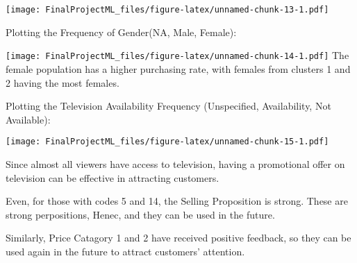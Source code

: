 \documentclass[
]{article}
\newenvironment{Shaded}{\begin{snugshade}}{\end{snugshade}}
\newcommand{\DataTypeTok}[1]{\textcolor[rgb]{0.13,0.29,0.53}{#1}}
\newcommand{\KeywordTok}[1]{\textcolor[rgb]{0.13,0.29,0.53}{\textbf{#1}}}
\newcommand{\NormalTok}[1]{#1}
\newcommand{\OperatorTok}[1]{\textcolor[rgb]{0.81,0.36,0.00}{\textbf{#1}}}
\newcommand{\OtherTok}[1]{\textcolor[rgb]{0.56,0.35,0.01}{#1}}
\newcommand{\StringTok}[1]{\textcolor[rgb]{0.31,0.60,0.02}{#1}}
\begin{document}
\texttt{[image: FinalProjectML\_files/figure-latex/unnamed-chunk-13-1.pdf]}

Plotting the Frequency of Gender(NA, Male, Female):

\begin{Shaded}
\end{Shaded}

\texttt{[image: FinalProjectML\_files/figure-latex/unnamed-chunk-14-1.pdf]}
The female population has a higher purchasing rate, with females from
clusters 1 and 2 having the most females.

Plotting the Television Availability Frequency (Unspecified,
Availability, Not Available):

\begin{Shaded}
\end{Shaded}

\texttt{[image: FinalProjectML\_files/figure-latex/unnamed-chunk-15-1.pdf]}

Since almost all viewers have access to television, having a promotional
offer on television can be effective in attracting customers.

Even, for those with codes 5 and 14, the Selling Proposition is strong.
These are strong perpositions, Henec, and they can be used in the
future.

Similarly, Price Catagory 1 and 2 have received positive feedback, so
they can be used again in the future to attract customers' attention.
\end{document}
